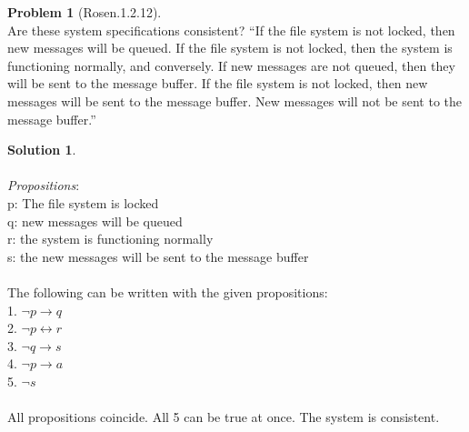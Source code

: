 \documentclass{article}
\theoremstyle{definition}
\newtheorem*{problem}{Problem}
\newtheorem*{solution}{Solution}
\begin{document}
\begin{problem}[Rosen.1.2.12]\ \\
Are these system specifications consistent? “If the file
system is not locked, then new messages will be queued.
If the file system is not locked, then the system is functioning
normally, and conversely. If new messages are not
queued, then they will be sent to the message buffer. If
the file system is not locked, then new messages will be
sent to the message buffer. New messages will not be sent
to the message buffer.”
\begin{compactenum}
\renewcommand{\theenumi}{\alph{enumi}}

\end{compactenum}
\end{problem}

\begin{solution}\ \\
\ \\
\textit{Propositions}:\ \\
p: The file system is locked\ \\
q: new messages will be queued\ \\
r: the system is functioning normally\ \\
s: the new messages will be sent to the message buffer\ \\
\ \\
The following can be written with the given propositions:\ \\
1. $\neg p \rightarrow  q$\ \\
2. $\neg p \leftrightarrow r$\ \\
3. $\neg q \rightarrow s$\ \\
4. $\neg p \rightarrow a$ \ \\
5. $\neg s$\ \\
\ \\
All propositions coincide. All 5 can be true at once. The system is consistent.
\begin{compactenum}
\renewcommand{\theenumi}{\alph{enumi}}

\end{compactenum}
\end{solution}
\end{document}
